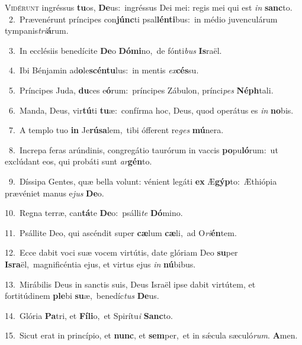 \lettrine{\initial\textcolor{\initialcolor}{V}}{idérunt} ingréssus \textbf{tu}\-os, \textbf{De}\-us:~\star ingréssus Dei mei: regis mei qui est \textit{in} \textbf{sanc}\-to.\\
{\numbfont\textcolor{\numbcolor}{~2.}}~Prævenérunt príncipes con\-\textbf{júnc}\-ti psal\-\textbf{lén}\-\textbf{ti}bus:~\star in médio juvenculárum tympanis\-\textit{tri}\-\textbf{á}rum.\par
{\numbfont\textcolor{\numbcolor}{~3.}}~In ecclésiis benedícite \textbf{De}\-o \textbf{Dó}\-\textbf{mi}no,~\star de fónti\textit{bus} \textbf{Is}\-raël.\par
{\numbfont\textcolor{\numbcolor}{~4.}}~Ibi Bénjamin ad\-\textbf{o}\-le\-\textbf{scén}\-\textbf{tu}lus:~\star in mentis \textit{ex}\-\textbf{cés}su.\par
{\numbfont\textcolor{\numbcolor}{~5.}}~Príncipes Juda, \textbf{du}\-ces e\-\textbf{ó}\-rum:~\star príncipes Zábulon, prínci\textit{pes} \textbf{Néph}\-tali.\par
{\numbfont\textcolor{\numbcolor}{~6.}}~Manda, Deus, vir\-\textbf{tú}\-ti \textbf{tu}\-æ:~\star confírma hoc, Deus, quod operátus es \textit{in} \textbf{no}\-bis.\par
{\numbfont\textcolor{\numbcolor}{~7.}}~A templo tuo \textbf{in} Je\-\textbf{rú}\-\textbf{sa}lem,~\star tibi ófferent re\textit{ges} \textbf{mú}\-nera.\par
{\numbfont\textcolor{\numbcolor}{~8.}}~Increpa feras arúndinis, congregátio taurórum in vaccis \textbf{po}\-pu\-\textbf{ló}\-rum:~\star ut exclúdant eos, qui probáti sunt \textit{ar}\-\textbf{gén}to.\par
{\numbfont\textcolor{\numbcolor}{~9.}}~Díssipa Gentes, quæ bella volunt: vénient legáti \textbf{ex} Æ\-\textbf{gýp}\-to:~\star Æthiópia prævéniet manus e\textit{jus} \textbf{De}\-o.\par
{\numbfont\textcolor{\numbcolor}{10.}}~Regna terræ, can\-\textbf{tá}\-te \textbf{De}\-o:~\star psálli\textit{te} \textbf{Dó}\-mino.\par
{\numbfont\textcolor{\numbcolor}{11.}}~Psállite Deo, qui ascéndit super \textbf{cæ}\-lum \textbf{cæ}\-li,~\star ad O\-\textit{ri}\-\textbf{én}tem.\par
{\numbfont\textcolor{\numbcolor}{12.}}~Ecce dabit voci suæ vocem virtútis, date glóriam Deo \textbf{su}\-per \textbf{Is}\-\textbf{ra}ël,~\star magnificéntia ejus, et virtus ejus \textit{in} \textbf{nú}\-bibus.\par
{\numbfont\textcolor{\numbcolor}{13.}}~Mirábilis Deus in sanctis suis, Deus Israël ipse dabit virtútem, et fortitúdinem \textbf{ple}\-bi \textbf{su}\-æ,~\star benedíc\textit{tus} \textbf{De}\-us.\par
{\numbfont\textcolor{\numbcolor}{14.}}~Glória \textbf{Pa}\-tri, et \textbf{Fí}\-\textbf{li}o,~\star et Spirítu\textit{i} \textbf{Sanc}\-to.\par
{\numbfont\textcolor{\numbcolor}{15.}}~Sicut erat in princípio, et \textbf{nunc}\-, et \textbf{sem}\-per,~\star et in sǽcula sæculó\-\textit{rum}\-. \textbf{A}\-men.\par
